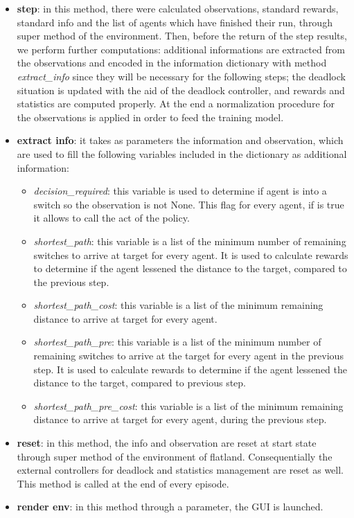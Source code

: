 \begin{itemize}
\item \textbf{step}: in this method, there were calculated observations, standard rewards, standard info and the list of agents which have finished their run, through super method of the environment.
Then, before the return of the step results, we perform further computations: additional informations are extracted from the observations and encoded in the information dictionary with method \textit{extract\_info} since they will be necessary for the following steps; the deadlock situation is updated with the aid of the deadlock controller, and rewards and statistics are computed properly. At the end a normalization procedure for the observations is applied in order to feed the training model.
\item \textbf{extract info}: it takes as parameters the information and observation, which are used to fill the following variables included in the dictionary as additional information:
\begin{itemize}
\item \textit{decision\_required}: this variable is used to determine if agent is into a switch so the observation is not None. This flag for every agent, if is true it allows to call the act of the policy.
\item \textit{shortest\_path}: this variable is a list of the minimum number of remaining switches to arrive at target for every agent. It is used to calculate rewards to determine if the agent lessened the distance to the target, compared to the previous step.
\item \textit{shortest\_path\_cost}: this variable is a list of the minimum remaining distance to arrive at target for every agent.
\item \textit{shortest\_path\_pre}: this variable is a list of the minimum number of remaining switches to arrive at the target for every agent in the previous step. It is used to calculate rewards to determine if the agent lessened the distance to the target, compared to previous step.
\item \textit{shortest\_path\_pre\_cost}: this variable is a list of the minimum remaining distance to arrive at target for every agent, during the previous step.
\end{itemize}
\item \textbf{reset}: in this method, the info and observation are reset at start state through super method of the environment of flatland. Consequentially the external controllers for deadlock and statistics management are reset as well. This method is called at the end of every episode.
\item \textbf{render env}: in this method through a parameter, the GUI is launched.
\end{itemize}
